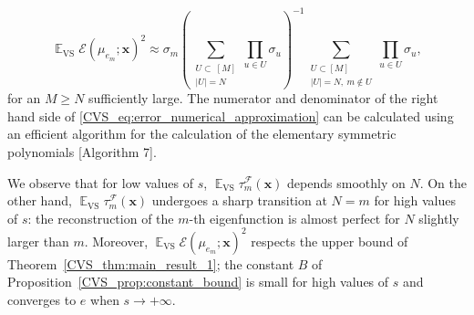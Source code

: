 \documentclass[twoside,11pt]{book}
\numberwithin{theorem}{chapter}
\numberwithin{definition}{chapter}
\numberwithin{proposition}{chapter}
\numberwithin{corollary}{chapter}
\numberwithin{example}{chapter}
\numberwithin{lemma}{chapter}
\numberwithin{assumption}{chapter}
\numberwithin{equation}{chapter}
\numberwithin{figure}{chapter}
\DeclareMathOperator{\VS}{\mathrm{VS}}
\DeclareMathOperator{\EX}{\mathbb{E}}
\DeclareMathOperator{\F}{\mathcal{F}}
\begin{document}
\begin{equation}\label{CVS_eq:error_numerical_approximation}
\EX_{\VS} \mathcal{E}(\mu_{e_{m}};\bm{x})^{2} \approx \sigma_{m} \left(\sum\limits_{\substack{U \subset \: [M]\\ |U|=N}} \prod\limits_{u \in U} \sigma_{u} \right)^{-1}  \sum\limits_{\substack{U \subset [M]\\ |U|=N, \: m \notin U}} \prod\limits_{u \in U} \sigma_{u},
\end{equation}
for an $M \geq N$ sufficiently large. The numerator and denominator of the right hand side of \eqref{CVS_eq:error_numerical_approximation} can be calculated using an efficient algorithm for the calculation of the elementary symmetric polynomials \citep{KuTa12}[Algorithm 7].

 


We observe that for low values of $s$, $\EX_{\VS} \tau_{m}^{\F}(\bm{x})$ depends smoothly on $N$. On the other hand, $\EX_{\VS} \tau_{m}^{\F}(\bm{x})$ undergoes a sharp transition at $N = m$ for high values of $s$: the reconstruction of the $m$-th eigenfunction is almost perfect for $N$ slightly larger than $m$. Moreover, $\EX_{\VS} \mathcal{E}(\mu_{e_{m}};\bm{x})^{2}$ respects the upper bound of Theorem~\ref{CVS_thm:main_result_1};
the constant $B$ of Proposition~\ref{CVS_prop:constant_bound} is small for high values of $s$ and converges to $e$ when $s \rightarrow +\infty$.
\end{document}
